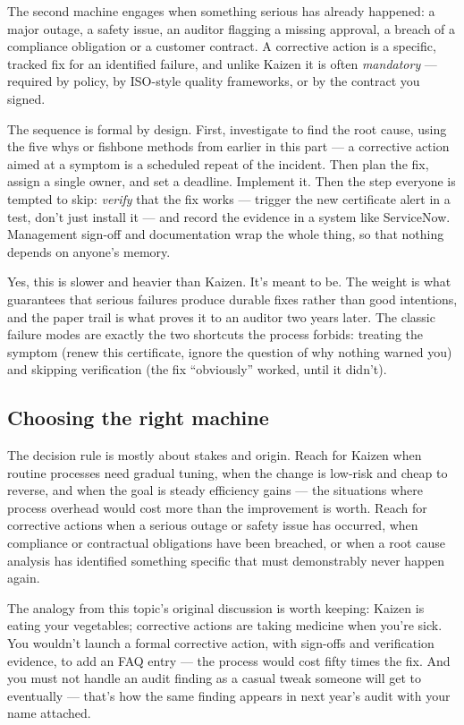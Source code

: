 The second machine engages when something serious has already happened: a major outage, a safety issue, an auditor flagging a missing approval, a breach of a compliance obligation or a customer contract. A corrective action is a specific, tracked fix for an identified failure, and unlike Kaizen it is often \emph{mandatory} — required by policy, by ISO-style quality frameworks, or by the contract you signed.


The sequence is formal by design. First, investigate to find the root cause, using the five whys or fishbone methods from earlier in this part — a corrective action aimed at a symptom is a scheduled repeat of the incident. Then plan the fix, assign a single owner, and set a deadline. Implement it. Then the step everyone is tempted to skip: \emph{verify} that the fix works — trigger the new certificate alert in a test, don't just install it — and record the evidence in a system like ServiceNow. Management sign-off and documentation wrap the whole thing, so that nothing depends on anyone's memory.


Yes, this is slower and heavier than Kaizen. It's meant to be. The weight is what guarantees that serious failures produce durable fixes rather than good intentions, and the paper trail is what proves it to an auditor two years later. The classic failure modes are exactly the two shortcuts the process forbids: treating the symptom (renew this certificate, ignore the question of why nothing warned you) and skipping verification (the fix ``obviously'' worked, until it didn't).



\subsection{Choosing the right machine}


The decision rule is mostly about stakes and origin. Reach for Kaizen when routine processes need gradual tuning, when the change is low-risk and cheap to reverse, and when the goal is steady efficiency gains — the situations where process overhead would cost more than the improvement is worth. Reach for corrective actions when a serious outage or safety issue has occurred, when compliance or contractual obligations have been breached, or when a root cause analysis has identified something specific that must demonstrably never happen again.


The analogy from this topic's original discussion is worth keeping: Kaizen is eating your vegetables; corrective actions are taking medicine when you're sick. You wouldn't launch a formal corrective action, with sign-offs and verification evidence, to add an FAQ entry — the process would cost fifty times the fix. And you must not handle an audit finding as a casual tweak someone will get to eventually — that's how the same finding appears in next year's audit with your name attached.



